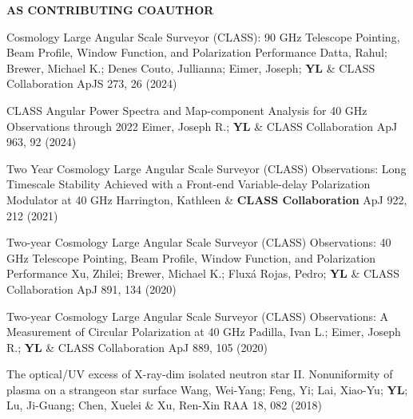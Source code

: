 \begin{footnotesize}
    \textsf{\textbf{ AS CONTRIBUTING COAUTHOR }}
\end{footnotesize}
\begin{etaremune}[topsep=0pt,itemsep=0pt,partopsep=0pt,parsep=0pt]
    \renewcommand\labelenumi{\footnotesize\bfseries\theenumi.}
    
            {Cosmology Large Angular Scale Surveyor (CLASS): 90 GHz Telescope Pointing, Beam Profile, Window Function, and Polarization Performance}
            {Datta, Rahul; Brewer, Michael K.; Denes Couto, Jullianna; Eimer, Joseph; \textbf{YL} \& CLASS Collaboration}
            {ApJS 273, 26 (2024)}
    
            {CLASS Angular Power Spectra and Map-component Analysis for 40 GHz Observations through 2022}
            {Eimer, Joseph R.; \textbf{YL} \& CLASS Collaboration}
            {ApJ 963, 92 (2024)}
    
            {Two Year Cosmology Large Angular Scale Surveyor (CLASS) Observations: Long Timescale Stability Achieved with a Front-end Variable-delay Polarization Modulator at 40 GHz}
            {Harrington, Kathleen \& \textbf{CLASS Collaboration}}
            {ApJ 922, 212 (2021)}
    
            {Two-year Cosmology Large Angular Scale Surveyor (CLASS) Observations: 40 GHz Telescope Pointing, Beam Profile, Window Function, and Polarization Performance}
            {Xu, Zhilei; Brewer, Michael K.; Fluxá Rojas, Pedro; \textbf{YL} \& CLASS Collaboration}
            {ApJ 891, 134 (2020)}
    
            {Two-year Cosmology Large Angular Scale Surveyor (CLASS) Observations: A Measurement of Circular Polarization at 40 GHz}
            {Padilla, Ivan L.; Eimer, Joseph R.; \textbf{YL} \& CLASS Collaboration}
            {ApJ 889, 105 (2020)}
    
            {The optical/UV excess of X-ray-dim isolated neutron star II. Nonuniformity of plasma on a strangeon star surface}
            {Wang, Wei-Yang; Feng, Yi; Lai, Xiao-Yu; \textbf{YL}; Lu, Ji-Guang; Chen, Xuelei \& Xu, Ren-Xin}
            {RAA 18, 082 (2018)}
    
\end{etaremune}
